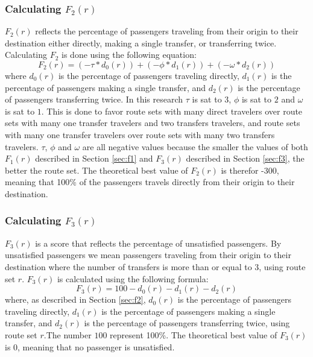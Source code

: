 \subsubsection{Calculating $F_{2}(r)$}
\label{sec:f2}
$F_{2}(r)$ reflects the percentage of passengers traveling from their origin to their destination either directly, making a single transfer, or transferring twice. Calculating $F_{2}$ is done using the following equation: 
\newline
$$F_2(r) = (-\tau*d_0(r)) + (-\phi*d_1(r)) + (-\omega*d_2(r))$$
\newline
where $d_0(r)$ is the percentage of passengers traveling directly, $d_1(r)$ is the percentage of passengers making a single transfer, and $d_2(r)$ is the percentage of passengers transferring twice. In this research $\tau$ is sat to $3$, $\phi$ is sat to $2$ and $\omega$ is sat to $1$. This is done to favor route sets with many direct travelers over route sets with many one transfer travelers and two transfers travelers, and route sets with many one transfer travelers over route sets with many two transfers travelers. $\tau$, $\phi$ and $\omega$ are all negative values because the smaller the values of both $F_{1}(r)$ described in Section \vref{sec:f1} and $F_{3}(r)$ described in Section \vref{sec:f3}, the better the route set. The theoretical best value of $F_{2}(r)$ is therefor -300, meaning that 100\% of the passengers travels directly from their origin to their destination. 

\subsubsection{Calculating $F_{3}(r)$}
\label{sec:f3}
$F_3(r)$ is a score that reflects the percentage of unsatisfied passengers. By unsatisfied passengers we mean passengers traveling from their origin to their destination where the number of transfers is more than or equal to 3, using route set $r$. $F_3(r)$ is calculated using the following formula:
\newline
$$F_3(r) = 100 - d_0(r) - d_1(r) - d_2(r)$$
\newline
where, as described in Section \vref{sec:f2}, $d_0(r)$ is the percentage of passengers traveling directly, $d_1(r)$ is the percentage of passengers making a single transfer, and $d_2(r)$ is the percentage of passengers transferring twice, using route set $r$.The number $100$ represent 100\%. The theoretical best value of $F_3(r)$ is 0, meaning that no passenger is unsatisfied. 

